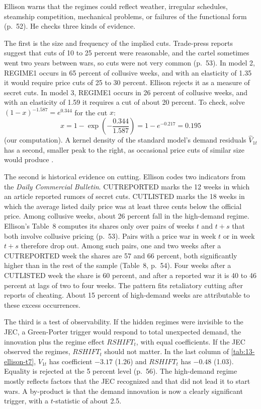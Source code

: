 Ellison warns that the regimes could reflect weather, irregular schedules, steamship competition, mechanical
problems, or failures of the functional form (p.~52). He checks three kinds of evidence.

The first is the size and frequency of the implied cuts. Trade-press reports suggest that cuts of 10 to 25 percent
were reasonable, and the cartel sometimes went two years between wars, so cuts were not very common (p.~53). In
model 2, REGIME1 occurs in 65 percent of collusive weeks, and with an elasticity of 1.35 it would require price cuts
of 25 to 30 percent. Ellison rejects it as a measure of secret cuts. In model 3, REGIME1 occurs in 26 percent of
collusive weeks, and with an elasticity of 1.59 it requires a cut of about 20 percent. To check, solve
$(1 - x)^{-1.587} = e^{0.344}$ for the cut $x$:
\begin{equation*}
  x = 1 - \exp\left(-\frac{0.344}{1.587}\right) = 1 - e^{-0.217} = 0.195
\end{equation*}
(our computation). A kernel density of the standard model's demand residuals $\hat V_{1t}$ has a second, smaller peak
to the right, as occasional price cuts of similar size would produce \citep[Figure~2]{Ellison1994}.

The second is historical evidence on cutting. Ellison codes two indicators from the \textit{Daily Commercial
Bulletin}. CUTREPORTED marks the 12 weeks in which an article reported rumors of secret cuts. CUTLISTED marks the 18
weeks in which the average listed daily price was at least three cents below the official price. Among collusive weeks,
about 26 percent fall in the high-demand regime. Ellison's Table~8 computes its shares only over pairs of weeks $t$ and
$t+s$ that both involve collusive pricing (p.~53). Pairs with a price war in week $t$ or in week $t+s$ therefore drop out. Among such
pairs, one and two weeks after a CUTREPORTED week the shares are 57 and 66 percent, both significantly higher than in
the rest of the sample (Table~8, p.~54). Four weeks after a CUTLISTED week the share is 60 percent, and after a
reported war it is 40 to 46 percent at lags of two to four weeks. The pattern fits retaliatory cutting after reports of
cheating. About 15 percent of high-demand weeks are attributable to these excess occurrences.

The third is a test of observability. If the hidden regimes were invisible to the JEC, a Green-Porter trigger would
respond to total unexpected demand, the innovation plus the regime effect $RSHIFT_t$, with equal coefficients. If the
JEC observed the regimes, $RSHIFT_t$ should not matter. In the last column of \cref{tab:13-ellison-t7}, $V_{1t}$ has
coefficient $-3.17$ (1.26) and $RSHIFT_t$ has $-0.48$ (1.03). Equality is rejected at the 5 percent level
(p.~56). The high-demand regime mostly reflects factors that the JEC recognized and that did not lead it to start
wars. A by-product is that the demand innovation is now a clearly significant trigger, with a $t$-statistic of about
2.5.

